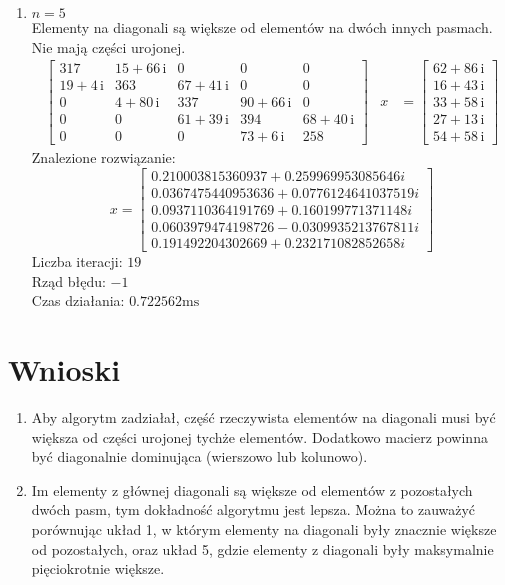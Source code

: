 \documentclass[12pt]{article}
\begin{document}
\begin{enumerate}[label=\textbf{Układ \arabic*}]
		\item
			$n = 5$\\
			Elementy na diagonali są większe od elementów na dwóch innych pasmach. Nie mają części urojonej.
			\begin{align*}
				\left[
					\begin{array}{ccccc} 317 & 15 + 66\, \mathrm{i} & 0 & 0 & 0\\ 19 + 4\, \mathrm{i} & 363 & 67 + 41\, \mathrm{i} & 0 & 0\\ 0 & 4 + 80\, \mathrm{i} & 337 & 90 + 66\, \mathrm{i} & 0\\ 0 & 0 & 61 + 39\, \mathrm{i} & 394 & 68 + 40\, \mathrm{i}\\ 0 & 0 & 0 & 73 + 6\, \mathrm{i} & 258 \end{array}
				\right]
				&x
				&=
				\left[
					\begin{array}{c} 62 + 86\, \mathrm{i}\\ 16 + 43\, \mathrm{i}\\ 33 + 58\, \mathrm{i}\\ 27 + 13\, \mathrm{i}\\ 54 + 58\, \mathrm{i} \end{array}
				\right]
			\end{align*}
			Znalezione rozwiązanie:
			$$
			x =
				\left[
					\begin{array}{c}
						0.210003815360937 + 0.259969953085646i\\
						0.0367475440953636 + 0.0776124641037519i\\
						0.0937110364191769 + 0.160199771371148i\\
						0.0603979474198726 - 0.0309935213767811i\\
						0.191492204302669 + 0.232171082852658i
					\end{array}
				\right]
			$$
			Liczba iteracji: $19$\\
			Rząd błędu: $-1$\\
			Czas działania: $0.722562\text{ms}$
	\end{enumerate}


	\section{Wnioski}
	
	\begin{enumerate}
		\item
			Aby algorytm zadziałał, część rzeczywista elementów na diagonali musi być większa od części urojonej tychże elementów. Dodatkowo macierz powinna być diagonalnie dominująca (wierszowo lub kolunowo).
			
		\item
			Im elementy z głównej diagonali są większe od elementów z pozostałych dwóch pasm, tym dokładność algorytmu jest lepsza. Można to zauważyć porównując układ 1, w którym elementy na diagonali były znacznie większe od pozostałych, oraz układ 5, gdzie elementy z diagonali były maksymalnie pięciokrotnie większe.
	\end{enumerate}
\end{document}
